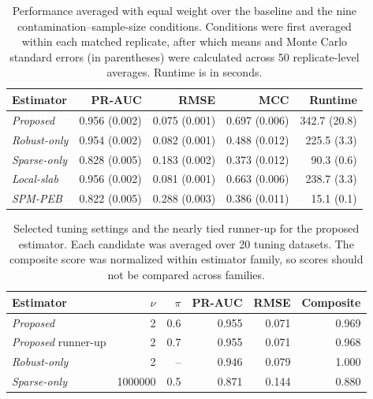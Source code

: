 \begin{table}[htbp]
\centering
\small
\setlength{\tabcolsep}{4pt}
\caption{Performance averaged with equal weight over the baseline and the nine contamination--sample-size conditions. Conditions were first averaged within each matched replicate, after which means and Monte Carlo standard errors (in parentheses) were calculated across 50 replicate-level averages. Runtime is in seconds.}
\label{tab:sim-headline}
\begin{tabular}{lrrrr}
\toprule
Estimator & PR-AUC & RMSE & MCC & Runtime\\
\midrule 
\emph{Proposed} & 0.956 (0.002) & 0.075 (0.001) & 0.697 (0.006) & 342.7 (20.8)\\ 
\emph{Robust-only} & 0.954 (0.002) & 0.082 (0.001) & 0.488 (0.012) & 225.5 (3.3)\\ 
\emph{Sparse-only} & 0.828 (0.005) & 0.183 (0.002) & 0.373 (0.012) & 90.3 (0.6)\\ 
\emph{Local-slab} & 0.956 (0.002) & 0.081 (0.001) & 0.663 (0.006) & 238.7 (3.3)\\ 
\emph{SPM-PEB} & 0.822 (0.005) & 0.288 (0.003) & 0.386 (0.011) & 15.1 (0.1)\\ 
\bottomrule
\end{tabular}
\end{table}
 
\begin{table}[htbp]
\centering
\small
\setlength{\tabcolsep}{4pt}
\caption{Selected tuning settings and the nearly tied runner-up for the proposed estimator. Each candidate was averaged over 20 tuning datasets. The composite score was normalized within estimator family, so scores should not be compared across families.}
\label{tab:supp-tuning}
\begin{tabular}{lrrrrr}
\toprule
Estimator & $\nu$ & $\pi$ & PR-AUC & RMSE & Composite\\
\midrule 
\emph{Proposed} & 2 & 0.6 & 0.955 & 0.071 & 0.969\\ 
\emph{Proposed} runner-up & 2 & 0.7 & 0.955 & 0.071 & 0.968\\ 
\emph{Robust-only} & 2 & -- & 0.946 & 0.079 & 1.000\\ 
\emph{Sparse-only} & 1000000 & 0.5 & 0.871 & 0.144 & 0.880\\ 
\bottomrule
\end{tabular}
\end{table}
 
